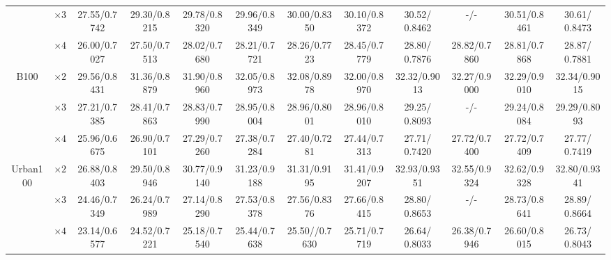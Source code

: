 \documentclass[10pt,twocolumn,letterpaper]{article}
\begin{document}
\begin{table*}[!htbp]
{\begin{tabular}{|c|c|c|c|c|c|c|c||c|c|c|c|}
			& $\times3$ &     27.55/0.7742         &     29.30/0.8215         &   29.78/0.8320   &      29.96/0.8349        &    30.00/0.8350 & 30.10/0.8372   &   {\color{blue} 30.52}/{\color{blue} 0.8462}   &   -/-   &  30.51/0.8461    &  {\color{red} 30.61}/{\color{red} 0.8473}     \\ 
			& $\times4$ &     26.00/0.7027         & 27.50/0.7513   &  28.02/0.7680    &   28.21/0.7721    &    28.26/0.7723  & 28.45/0.7779      &   28.80/{\color{blue} 0.7876}     &   {\color{blue} 28.82}/0.7860   &  28.81/0.7868      &    {\color{red} 28.87}/{\color{red} 0.7881}      \\ \hline\hline
			\multirow{3}{*}{B100}     & $\times2$ &  29.56/0.8431            &     31.36/0.8879        &   31.90/0.8960   &     32.05/0.8973     &    32.08/0.8978  & 32.00/0.8970   &  {\color{blue}32.32}/{\color{blue}0.9013}    &   32.27/0.9000  &  32.29/0.9010    &   {\color{red}32.34}/{\color{red}0.9015}   \\
			& $\times3$ &    27.21/0.7385          &    28.41/0.7863          &  28.83/0.7990    &       28.95/0.8004     &   28.96/0.8001 & 28.96/0.8010    &  {\color{blue}29.25}/{\color{red} 0.8093}    &    -/-   &  29.24/{\color{blue}0.8084}    &  {\color{red}29.29}/{\color{red}0.8093}     \\ 
			& $\times4$ &    25.96/0.6675          &     26.90/0.7101         &   27.29/0.7260   &    27.38/0.7284        &     27.40/0.7281 & 27.44/0.7313  &   27.71/{\color{blue} 0.7420}   &  {\color{blue} 27.72}/0.7400    &  {\color{blue} 27.72}/0.7409    &  {\color{red} 27.77}/{\color{red} 0.7419}      \\ \hline\hline
			\multirow{3}{*}{Urban100} & $\times2$ &  26.88/0.8403            &    29.50/0.8946          &  30.77/0.9140    &        31.23/0.9188    &    31.31/0.9195  & 31.41/0.9207  &  {\color{red}32.93}/{\color{red}0.9351}    &   32.55/0.9324   &  32.62/0.9328    &  {\color{blue}32.80}/{\color{blue}0.9341}     \\ 
			& $\times3$ &   24.46/0.7349           &     26.24/0.7989         &  27.14/0.8290    &       27.53/0.8378       &   27.56/0.8376 & 27.66/0.8415    &   {\color{blue}28.80}/{\color{blue} 0.8653}   &   -/-   &    28.73/0.8641  &   {\color{red} 28.89}/{\color{red} 0.8664}    \\
			& $\times4$ &   23.14/0.6577            &       24.52/0.7221       &    25.18/0.7540  &      25.44/0.7638       &    25.50//0.7630  & 25.71/0.7719  &   {\color{blue} 26.64}/{\color{blue} 0.8033}   &   26.38/0.7946   &  26.60/0.8015   & {\color{red} 26.73}/{\color{red} 0.8043}      \\ \hline\hline

\end{tabular}}
\end{table*}
\end{document}

